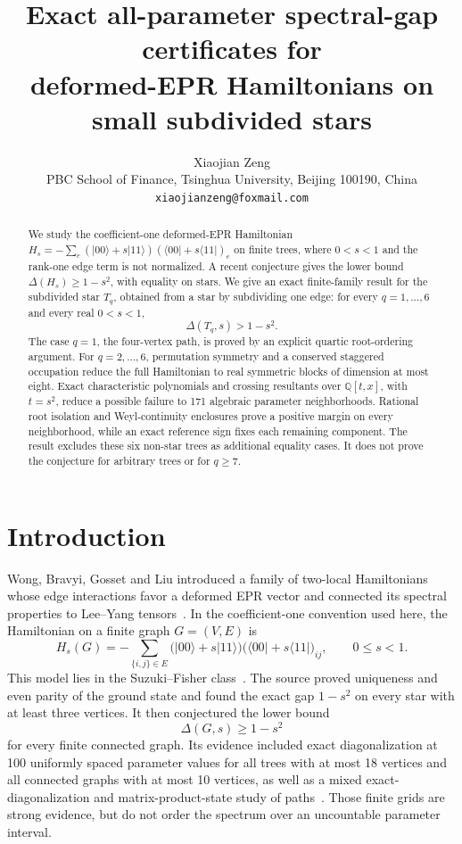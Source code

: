 \documentclass[11pt]{article}
\title{Exact all-parameter spectral-gap certificates for\\
deformed-EPR Hamiltonians on small subdivided stars}
\author{Xiaojian Zeng\\
\small PBC School of Finance, Tsinghua University, Beijing 100190, China\\
\small \texttt{xiaojianzeng@foxmail.com}}
\date{}
\newcommand{\Q}{\mathbb Q}
\newcommand{\ket}[1]{\lvert #1\rangle}
\newcommand{\bra}[1]{\langle #1\rvert}
\begin{document}
\maketitle

\begin{abstract}
We study the coefficient-one deformed-EPR Hamiltonian
\(H_s=-\sum_{e}(\ket{00}+s\ket{11})(\bra{00}+s\bra{11})_e\)
on finite trees, where \(0<s<1\) and the rank-one edge term is not
normalized.  A recent conjecture gives the lower bound
\(\Delta(H_s)\geq 1-s^2\), with equality on stars.  We give an exact
finite-family result for the subdivided star \(T_q\), obtained from a star
by subdividing one edge: for every \(q=1,\ldots,6\) and every real
\(0<s<1\),
\[
  \Delta(T_q,s)>1-s^2.
\]
The case \(q=1\), the four-vertex path, is proved by an explicit quartic
root-ordering argument.  For \(q=2,\ldots,6\), permutation symmetry and a
conserved staggered occupation reduce the full Hamiltonian to real
symmetric blocks of dimension at most eight.  Exact characteristic
polynomials and crossing resultants over \(\Q[t,x]\), with \(t=s^2\),
reduce a possible failure to 171 algebraic parameter neighborhoods.
Rational root isolation and Weyl-continuity enclosures prove a positive
margin on every neighborhood, while an exact reference sign fixes each
remaining component.  The result excludes these six non-star trees as
additional equality cases.  It does not prove the conjecture for arbitrary
trees or for \(q\geq7\).
\end{abstract}

\section{Introduction}

Wong, Bravyi, Gosset and Liu introduced a family of two-local Hamiltonians
whose edge interactions favor a deformed EPR vector and connected its
spectral properties to Lee--Yang tensors~\cite{wong2026}.  In the
coefficient-one convention used here, the Hamiltonian on a finite graph
\(G=(V,E)\) is
\begin{equation}
 H_s(G)=-\sum_{\{i,j\}\in E}
 \bigl(\ket{00}+s\ket{11}\bigr)
 \bigl(\bra{00}+s\bra{11}\bigr)_{ij},
 \qquad 0\leq s<1.                                      \label{eq:H}
\end{equation}
This model lies in the Suzuki--Fisher class~\cite{suzuki1971}.  The source
proved uniqueness and even parity of the ground state and found the exact
gap \(1-s^2\) on every star with at least three vertices.  It then
conjectured the lower bound
\begin{equation}
       \Delta(G,s)\geq 1-s^2                            \label{eq:conj}
\end{equation}
for every finite connected graph.  Its evidence included exact
diagonalization at 100 uniformly spaced parameter values for all trees with
at most 18 vertices and all connected graphs with at most 10 vertices, as
well as a mixed exact-diagonalization and matrix-product-state study of
paths~\cite{wong2026}.  Those finite grids are strong evidence, but do not
order the spectrum over an uncountable parameter interval.
\end{document}
